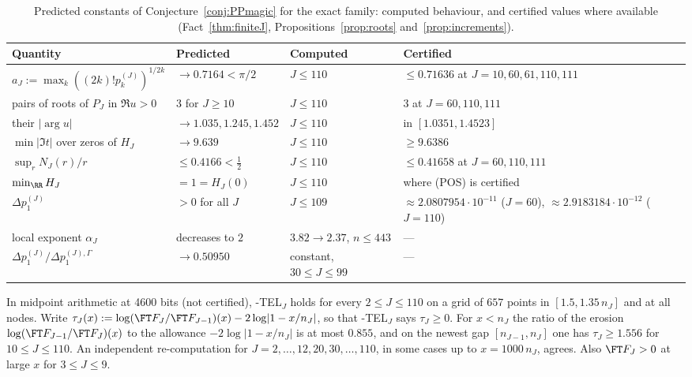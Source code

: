 \begin{table}[ht]
\centering\small
\caption{Predicted constants of Conjecture~\ref{conj:PPmagic} for the exact family: computed behaviour, and certified
values where available (Fact~\ref{thm:finiteJ}, Propositions~\ref{prop:roots} and~\ref{prop:increments}).}\label{tab:app-predicted}
\begin{tabular}{@{}>{\raggedright\arraybackslash}p{}>{\raggedright\arraybackslash}p{}>{\raggedright\arraybackslash}p{}>{\raggedright\arraybackslash}p{}@{}}
\toprule
Quantity & Predicted & Computed & Certified \\
\midrule
$a_J:=\max_k((2k)!p^{(J)}_k)^{1/2k}$ & $\to0.7164<\pi/2$ & $J\le110$ & $\le0.71636$ at $J=10,60,61,110,111$ \\
pairs of roots of $P_J$ in $\Re u>0$ & $3$ for $J\ge10$ & $J\le110$ & $3$ at $J=60,110,111$ \\
their $\lvert\arg u\rvert$ & $\to1.035,1.245,1.452$ & $J\le110$ & in $[1.0351,1.4523]$ \\
$\min|\Im t|$ over zeros of $H_J$ & $\to9.639$ & $J\le110$ & $\ge9.6386$ \\
$\sup_rN_J(r)/r$ & $\le0.4166<\frac12$ & $J\le110$ & $\le0.41658$ at $J=60,110,111$ \\
$\min_{\RR}H_J$ & $=1=H_J(0)$ & $J\le110$ & where (POS) is certified \\
$\Delta p_1^{(J)}$ & $>0$ for all $J$ & $J\le109$ & $\approx2.0807954\cdot10^{-11}$ ($J=60$), $\approx2.9183184\cdot10^{-12}$
($J=110$) \\
local exponent $\alpha_J$ & decreases to $2$ & $3.82\to2.37$, $n\le443$ & --- \\
$\Delta p_1^{(J)}/\Delta p_1^{(J),\Gamma}$ & $\to0.50950$ & constant, $30\le J\le99$ & --- \\
\bottomrule
\end{tabular}
\end{table}

\begin{observation}\label{obs:TEL}
In midpoint arithmetic at 4600 bits (not certified), \hyp{TEL$_J$} holds for every $2\le J\le110$ on a grid of $657$
points in $[1.5,1.35\,n_J]$ and at all nodes. Write $\tau_J(x):=\log(\FT F_J/\FT F_{J-1})(x)-2\log\lvert1-x/n_J\rvert$, so that
\hyp{TEL$_J$} says $\tau_J\ge0$. For $x<n_J$ the ratio of the erosion $\log(\FT F_{J-1}/\FT F_J)(x)$ to the allowance
$-2\log\lvert1-x/n_J\rvert$ is at most $0.855$, and on the newest gap $[n_{J-1},n_J]$ one has $\tau_J\ge1.556$ for
$10\le J\le110$. An independent re-computation for $J=2,\dots,12,20,30,\dots,110$, in some cases up to $x=1000\,n_J$,
agrees. Also $\FT F_J>0$ at large $x$ for $3\le J\le9$.
\end{observation}

